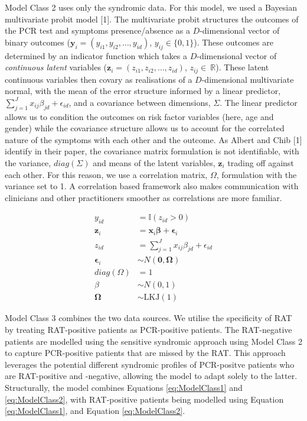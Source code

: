 \documentclass[]{elsarticle} %
\begin{document}
Model Class 2 uses only the syndromic data.
For this model, we used a Bayesian multivariate probit model {[}1{]}.
The multivariate probit structures the outcomes of the PCR test and symptoms presence/absence as a \(D\)-dimensional vector of binary outcomes (\(\boldsymbol{y}_i=(y_{i1},y_{i2},\dots,y_{id})\), \(y_{ij}\in\{0,1\}\)).
These outcomes are determined by an indicator function which takes a \(D\)-dimensional vector of \emph{continuous latent} variables (\(\boldsymbol{z}_i=(z_{i1},z_{i2},\dots,z_{id})\), \(z_{ij}\in\ \mathbb{R}\)).
These latent continuous variables then covary as realisations of a \(D\)-dimensional multivariate normal,
with the mean of the error structure informed by a linear predictor, \(\sum_{j=1}^J x_{ij}\beta_{jd} + \epsilon_{id}\), and a covariance between dimensions, \(\Sigma\).
The linear predictor allows us to condition the outcomes on risk factor variables (here, age and gender) while the covariance structure allows us to account for the correlated nature of the symptoms with each other and the outcome.
As Albert and Chib {[}1{]} identify in their paper, the covariance matrix formulation is not identifiable, with the variance, \(diag (\Sigma)\) and means of the latent variables, \(\boldsymbol{z}_i\) trading off against each other.
For this reason, we use a correlation matrix, \(\Omega\), formulation with the variance set to 1.
A correlation based framework also makes communication with clinicians and other practitioners smoother as correlations are more familiar.

\begin{equation}\begin{aligned}
y_{id} &= \mathbb{I}(z_{id} > 0) \\
\boldsymbol{z}_{i} &= \boldsymbol{x}_i \boldsymbol{\beta} + \boldsymbol{\epsilon}_{i} \\
z_{id} &= \sum_{j=1}^J x_{ij}\beta_{jd} + \epsilon_{id} \\
\boldsymbol{\epsilon}_i &\sim N(\boldsymbol{0}, \boldsymbol{\Omega}) \\
diag(\Omega)&=1 \\
{\beta} &\sim N(0,1) \\
\boldsymbol{\Omega} &\sim \text{LKJ}(1)
\label{eq:ModelClass2}
\end{aligned}\end{equation}\ignorespacesafterend

Model Class 3 combines the two data sources.
We utilise the specificity of RAT by treating RAT-positive patients as PCR-positive patients.
The RAT-negative patients are modelled using the sensitive syndromic approach using Model Class 2 to capture PCR-positive patients that are missed by the RAT.
This approach leverages the potential different syndromic profiles of PCR-positve patients who are RAT-positive and -negative, allowing the model to adapt solely to the latter.
Structurally, the model combines Equations \eqref{eq:ModelClass1} and \eqref{eq:ModelClass2}, with RAT-positive patients being modelled using Equation \eqref{eq:ModelClass1}, and Equation \eqref{eq:ModelClass2}.
\end{document}
